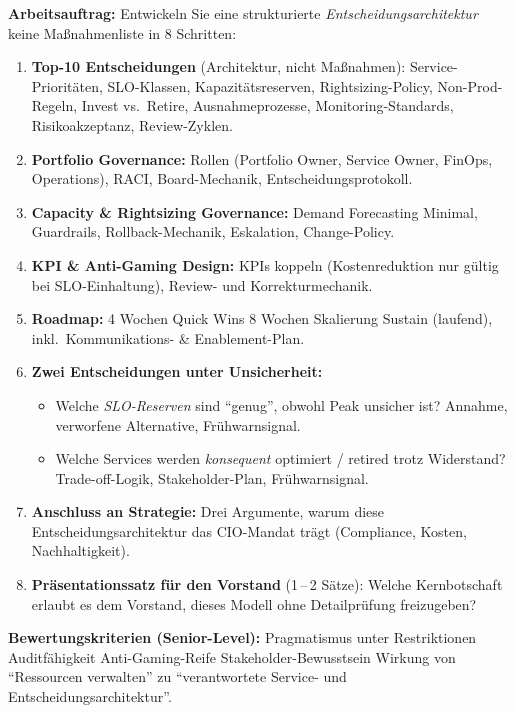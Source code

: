 \documentclass[11pt,a4paper,oneside]{article}
\begin{document}
\noindent\textbf{Arbeitsauftrag:} Entwickeln Sie eine strukturierte \emph{Entscheidungsarchitektur} \textendash{} keine Ma{\ss}nahmenliste \textendash{} in 8 Schritten:

\begin{enumerate}
  \item \textbf{Top-10 Entscheidungen} (Architektur, nicht Ma{\ss}nahmen): Service-Priorit\"aten, SLO-Klassen, Kapazit\"atsreserven, Rightsizing-Policy, Non-Prod-Regeln, Invest vs.\ Retire, Ausnahmeprozesse, Monitoring-Standards, Risikoakzeptanz, Review-Zyklen.
  \item \textbf{Portfolio Governance:} Rollen (Portfolio Owner, Service Owner, FinOps, Operations), RACI, Board-Mechanik, Entscheidungsprotokoll.
  \item \textbf{Capacity \& Rightsizing Governance:} Demand Forecasting Minimal, Guardrails, Rollback-Mechanik, Eskalation, Change-Policy.
  \item \textbf{KPI \& Anti-Gaming Design:} KPIs koppeln (Kostenreduktion nur g\"ultig bei SLO-Einhaltung), Review- und Korrekturmechanik.
  \item \textbf{Roadmap:} 4 Wochen Quick Wins \textrightarrow{} 8 Wochen Skalierung \textrightarrow{} Sustain (laufend), inkl.\ Kommunikations- \& Enablement-Plan.
  \item \textbf{Zwei Entscheidungen unter Unsicherheit:}
    \begin{itemize}
      \item Welche \emph{SLO-Reserven} sind ``genug'', obwohl Peak unsicher ist? Annahme, verworfene Alternative, Fr\"uhwarnsignal.
      \item Welche Services werden \emph{konsequent} optimiert / retired trotz Widerstand? Trade-off-Logik, Stakeholder-Plan, Fr\"uhwarnsignal.
    \end{itemize}
  \item \textbf{Anschluss an Strategie:} Drei Argumente, warum diese Entscheidungsarchitektur das CIO-Mandat tr\"agt (Compliance, Kosten, Nachhaltigkeit).
  \item \textbf{Pr\"asentationssatz f\"ur den Vorstand} (1\,--\,2 S\"atze): Welche Kernbotschaft erlaubt es dem Vorstand, dieses Modell ohne Detailpr\"ufung freizugeben?
\end{enumerate}

\noindent\textbf{Bewertungskriterien (Senior-Level):} Pragmatismus unter Restriktionen \textperiodcentered{} Auditf\"ahigkeit \textperiodcentered{} Anti-Gaming-Reife \textperiodcentered{} Stakeholder-Bewusstsein \textperiodcentered{} Wirkung von ``Ressourcen verwalten'' zu ``verantwortete Service- und Entscheidungsarchitektur''.
\end{document}
